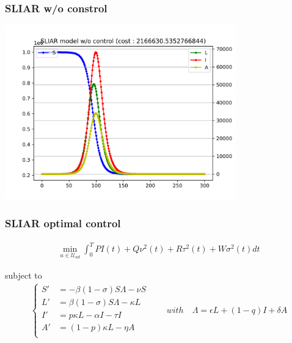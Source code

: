 \documentclass[usenames,dvipsnames, aspectratio=169, 9pt]{beamer}
\begin{document}
\begin{frame}\frametitle{SLIAR w/o constrol}
    \centering
    \includegraphics[width=10cm]{figure/sliar_wo_control.png}
\end{frame}


\begin{frame}\frametitle{SLIAR optimal control}
\begin{align*}
\min_{u\in\mathcal{U}_{ad}} \int_0^T PI(t) + Q\nu^2(t) + R\tau^2(t) + W\sigma^2(t) dt
\end{align*}

    subject to 
    \begin{align*}
    \begin{cases}
        S' &= -\beta (1-\sigma) S\Lambda - \nu S\\
        L' &= \beta (1-\sigma) S\Lambda - \kappa L\\
        I' &= p\kappa L - \alpha I - \tau I \\
        A' &= (1-p)\kappa L - \eta A \\
   \end{cases} \qquad with \quad \Lambda = \epsilon L + (1 - q) I + \delta A
   \end{align*}
\end{frame}
\end{document}
